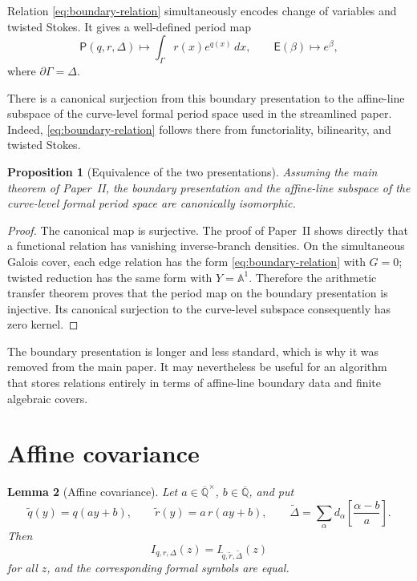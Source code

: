\documentclass[11pt]{article}
\newtheorem{proposition}{Proposition}[section]
\newtheorem{lemma}[proposition]{Lemma}
\theoremstyle{definition}
\newcommand{\Qbar}{\overline{\mathbb Q}}
\newcommand{\Aone}{\mathbb A^1}
\begin{document}
Relation \eqref{eq:boundary-relation} simultaneously encodes change of
variables and twisted Stokes.  It gives a well-defined period map
\[
  \mathsf P(q,r,\Delta)
  \longmapsto
  \int_\Gamma r(x)e^{q(x)}\,dx,
  \qquad
  \mathsf E(\beta)\longmapsto e^\beta,
\]
where $\partial\Gamma=\Delta$.

There is a canonical surjection from this boundary presentation to the
affine-line subspace of the curve-level formal period space used in the
streamlined paper.  Indeed, \eqref{eq:boundary-relation} follows there from
functoriality, bilinearity, and twisted Stokes.

\begin{proposition}[Equivalence of the two presentations]
Assuming the main theorem of Paper~II, the boundary presentation and the
affine-line subspace of the curve-level formal period space are canonically
isomorphic.
\end{proposition}

\begin{proof}
The canonical map is surjective.  The proof of Paper~II shows directly that
a functional relation has vanishing inverse-branch densities.  On the
simultaneous Galois cover, each edge relation has the form
\eqref{eq:boundary-relation} with $G=0$; twisted reduction has the same form
with $Y=\Aone$.  Therefore the arithmetic transfer theorem proves that the
period map on the boundary presentation is injective.  Its canonical
surjection to the curve-level subspace consequently has zero kernel.
\end{proof}

The boundary presentation is longer and less standard, which is why it was
removed from the main paper.  It may nevertheless be useful for an
algorithm that stores relations entirely in terms of affine-line boundary
data and finite algebraic covers.

\section{Affine covariance}

\begin{lemma}[Affine covariance]
Let $a\in\Qbar^\times$, $b\in\Qbar$, and put
\[
  \widetilde q(y)=q(ay+b),
  \qquad
  \widetilde r(y)=a\,r(ay+b),
  \qquad
  \widetilde\Delta
  =\sum_\alpha d_\alpha
    \left[\frac{\alpha-b}{a}\right].
\]
Then
\[
  I_{q,r,\Delta}(z)
  =I_{\widetilde q,\widetilde r,\widetilde\Delta}(z)
\]
for all $z$, and the corresponding formal symbols are equal.
\end{lemma}
\end{document}

